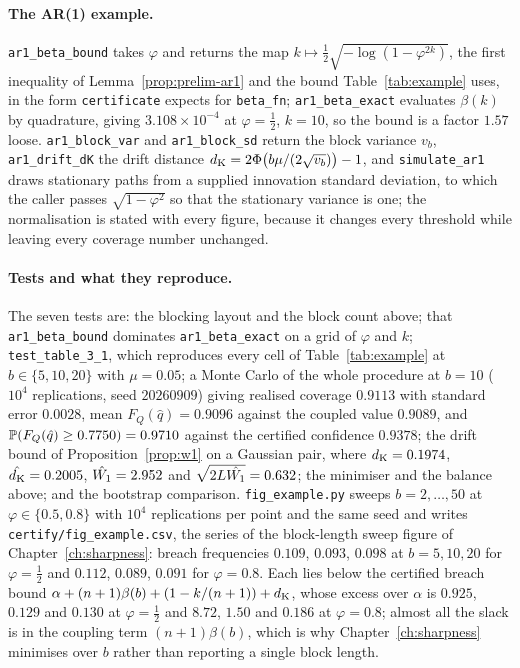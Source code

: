 \paragraph{The AR(1) example.}
\texttt{ar1\_beta\_bound} takes $\varphi$ and returns the map $k\mapsto\tfrac12\sqrt{-\log(1-\varphi^{2k})}$, the first inequality of Lemma~\ref{prop:prelim-ar1} and the bound Table~\ref{tab:example} uses, in the form \texttt{certificate} expects for \texttt{beta\_fn}; \texttt{ar1\_beta\_exact} evaluates $\beta(k)$ by quadrature, giving $3.108\times10^{-4}$ at $\varphi=\tfrac12$, $k=10$, so the bound is a factor $1.57$ loose. \texttt{ar1\_block\_var} and \texttt{ar1\_block\_sd} return the block variance $v_b$, \texttt{ar1\_drift\_dK} the drift distance $d_{\mathrm{K}}=2\Phi\big(b\mu/(2\sqrt{v_b})\big)-1$, and \texttt{simulate\_ar1} draws stationary paths from a supplied innovation standard deviation, to which the caller passes $\sqrt{1-\varphi^2}$ so that the stationary variance is one; the normalisation is stated with every figure, because it changes every threshold while leaving every coverage number unchanged.

\paragraph{Tests and what they reproduce.}
The seven tests are: the blocking layout and the block count above; that \texttt{ar1\_beta\_bound} dominates \texttt{ar1\_beta\_exact} on a grid of $\varphi$ and $k$; \texttt{test\_table\_3\_1}, which reproduces every cell of Table~\ref{tab:example} at $b\in\{5,10,20\}$ with $\mu=0.05$; a Monte Carlo of the whole procedure at $b=10$ ($10^4$ replications, seed $20260909$) giving realised coverage $0.9113$ with standard error $0.0028$, mean $F_Q(\hat q)=0.9096$ against the coupled value $0.9089$, and $\mathbb{P}(F_Q(\hat q)\ge0.7750)=0.9710$ against the certified confidence $0.9378$; the drift bound of Proposition~\ref{prop:w1} on a Gaussian pair, where $d_{\mathrm{K}}=0.1974$, $\hat{d_{\mathrm{K}}}=0.2005$, $\hat{W_1}=2.952$ and $\sqrt{2L\hat{W_1}}=0.632$; the minimiser and the balance above; and the bootstrap comparison. \texttt{fig\_example.py} sweeps $b=2,\dots,50$ at $\varphi\in\{0.5,0.8\}$ with $10^4$ replications per point and the same seed and writes \texttt{certify/fig\_example.csv}, the series of the block-length sweep figure of Chapter~\ref{ch:sharpness}: breach frequencies $0.109$, $0.093$, $0.098$ at $b=5,10,20$ for $\varphi=\tfrac12$ and $0.112$, $0.089$, $0.091$ for $\varphi=0.8$. Each lies below the certified breach bound $\alpha+(n+1)\beta(b)+(1-k/(n+1))+d_{\mathrm{K}}$, whose excess over $\alpha$ is $0.925$, $0.129$ and $0.130$ at $\varphi=\tfrac12$ and $8.72$, $1.50$ and $0.186$ at $\varphi=0.8$; almost all the slack is in the coupling term $(n+1)\beta(b)$, which is why Chapter~\ref{ch:sharpness} minimises over $b$ rather than reporting a single block length.

